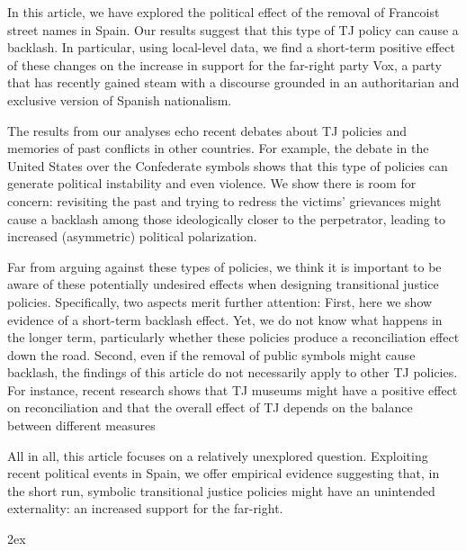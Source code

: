 \documentclass[12pt, notitlepage]{article}
\begin{document}
In this article, we have explored the political effect of the removal of Francoist street names in Spain.
Our results suggest that this type of TJ policy can cause a backlash.
In particular, using local-level data, we find a short-term positive effect of these changes on the increase in support for the far-right party Vox, a party that has recently gained steam with a discourse grounded in an authoritarian and exclusive version of Spanish nationalism.

The results from our analyses echo recent debates about TJ policies and memories of past conflicts in other countries. For example, the debate in the United States over the Confederate symbols shows that this type of policies can generate political instability and even violence. We show there is room for concern: revisiting the past and trying to redress the victims' grievances might cause a backlash among those ideologically closer to the perpetrator, leading to increased (asymmetric) political polarization.

Far from arguing against these types of policies, we think it is important to be aware of these potentially undesired effects when designing transitional justice policies. Specifically, two aspects merit further attention:
First, here we show evidence of a short-term backlash effect. Yet, we do not know what happens in the longer term, particularly whether these policies produce a reconciliation effect down the road. Second, even if the removal of public symbols might cause backlash, the findings of this article do not necessarily apply to other TJ policies. For instance, recent research shows that TJ museums might have a positive effect on reconciliation \citep{Balcells:2020aa} and that the overall effect of TJ depends on the balance between different measures \citep{Olsen:2010aa, Loyle:2017aa}

All in all, this article focuses on a relatively unexplored question. Exploiting recent political events in Spain, we offer empirical evidence suggesting that, in the short run, symbolic transitional justice policies might have an unintended externality: an increased support for the far-right.

\newpage
\begingroup
\parindent 0pt
\parskip 2ex
\def\enotesize{\normalsize}
\theendnotes
\endgroup

\clearpage



\newpage

\end{document}
